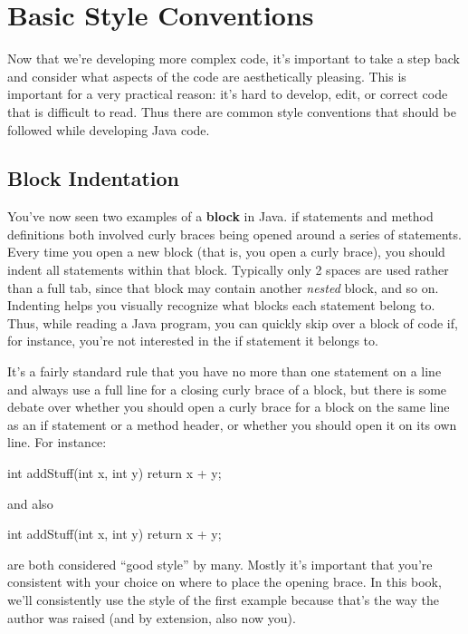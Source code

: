 \section{Basic Style Conventions}

Now that we're developing more complex code, it's important to take a step back and consider what aspects of the code are aesthetically pleasing. This is important for a very practical reason: it's hard to develop, edit, or correct code that is difficult to read. Thus there are common style conventions that should be followed while developing Java code. 

\subsection{Block Indentation}

You've now seen two examples of a \textbf{block} in Java. if statements and method definitions both involved curly braces being opened around a series of statements. Every time you open a new block (that is, you open a curly brace), you should indent all statements within that block. Typically only 2 spaces are used rather than a full tab, since that block may contain another \textit{nested} block, and so on. Indenting helps you visually recognize what blocks each statement belong to. Thus, while reading a Java program, you can quickly skip over a block of code if, for instance, you're not interested in the if statement it belongs to. 

It's a fairly standard rule that you have no more than one statement on a line and always use a full line for a closing curly brace of a block, but there is some debate over whether you should open a curly brace for a block on the same line as an if statement or a method header, or whether you should open it on its own line. For instance:

\begin{code}
int addStuff(int x, int y) {
  return x + y;
}
\end{code}

and also

\begin{code}
int addStuff(int x, int y) 
{
  return x + y;
}
\end{code}

are both considered ``good style'' by many. Mostly it's important that you're consistent with your choice on where to place the opening brace. In this book, we'll consistently use the style of the first example because that's the way the author was raised (and by extension, also now you).

